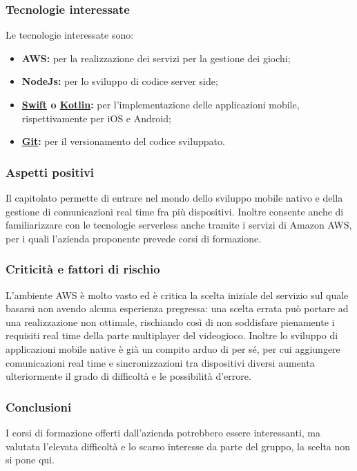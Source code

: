 \subsubsection{Tecnologie interessate}
    Le tecnologie interessate sono:
    \begin{itemize}
    	\item \textbf{AWS: }per la realizzazione dei servizi per la gestione dei giochi;
    	\item \textbf{NodeJs: }per lo sviluppo di codice server side;
    	\item \textbf{\href{https://swift.org/about/}{Swift} o \href{https://kotlinlang.org/}{Kotlin}: }per l'implementazione delle applicazioni mobile, rispettivamente per iOS e Android;
    	\item \textbf{\href{https://git-scm.com/about}{Git}: }per il versionamento del codice sviluppato.
    \end{itemize}
\subsubsection{Aspetti positivi}
    Il capitolato permette di entrare nel mondo dello sviluppo mobile nativo e della gestione di comunicazioni real time fra più dispositivi. Inoltre consente anche di familiarizzare con le tecnologie serverless anche tramite i servizi di Amazon AWS, per i quali l'azienda proponente prevede corsi di formazione.
\subsubsection{Criticità e fattori di rischio}
    L'ambiente AWS è molto vasto ed è critica la scelta iniziale del servizio sul quale basarsi non avendo alcuna esperienza pregressa: una scelta errata può portare ad una realizzazione non ottimale, rischiando così di non soddisfare pienamente i requisiti real time della parte multiplayer del videogioco. Inoltre lo sviluppo di applicazioni mobile native è già un compito arduo di per sé, per cui aggiungere comunicazioni real time e sincronizzazioni tra dispositivi diversi aumenta ulteriormente il grado di difficoltà e le possibilità d'errore.
\subsubsection{Conclusioni}
    I corsi di formazione offerti dall'azienda potrebbero essere interessanti, ma valutata l'elevata difficoltà e lo scarso interesse da parte del gruppo, la scelta non si pone qui.